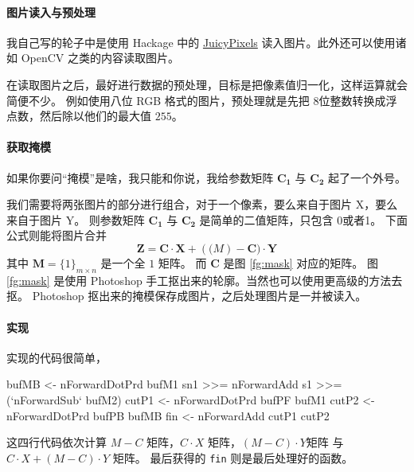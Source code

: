 \paragraph{图片读入与预处理}
我自己写的轮子中是使用 Hackage 中的 \href{http://hackage.haskell.org/package/JuicyPixels}{JuicyPixels}
读入图片。此外还可以使用诸如 OpenCV 之类的内容读取图片。

在读取图片之后，最好进行数据的预处理，目标是把像素值归一化，这样运算就会简便不少。
例如使用八位 RGB 格式的图片，预处理就是先把 8位整数转换成浮点数，然后除以他们的最大值 $255$。

\paragraph{获取掩模}
如果你要问“掩模”是啥，我只能和你说，我给参数矩阵 $\mathbf{C_1}$ 与 $\mathbf{C_2}$ 起了一个外号。

我们需要将两张图片的部分进行组合，对于一个像素，要么来自于图片 X，要么来自于图片 Y。
则参数矩阵 $\mathbf{C_1}$ 与 $\mathbf{C_2}$ 是简单的二值矩阵，只包含 0或者1。
下面公式则能将图片合并
\[
    \mathbf{Z} = \mathbf{C} \cdot \mathbf{X} + (\mathbf(M) - \mathbf{C}) \cdot \mathbf{Y}
\]
其中 $\mathbf{M} = \{1\}_{m \times n}$ 是一个全 $1$ 矩阵。
而 $\mathbf{C}$ 是图 \ref{fg:mask} 对应的矩阵。
图 \ref{fg:mask} 是使用 Photoshop 手工抠出来的轮廓。当然也可以使用更高级的方法去抠。
Photoshop 抠出来的掩模保存成图片，之后处理图片是一并被读入。

\paragraph{实现}
实现的代码很简单，
\begin{lstlistings}[language=Haskell]
bufMB <- nForwardDotPrd bufM1 sn1 >>= nForwardAdd s1 >>= (`nForwardSub` bufM2)
cutP1 <- nForwardDotPrd bufPF bufM1
cutP2 <- nForwardDotPrd bufPB bufMB
fin <- nForwardAdd cutP1 cutP2
\end{lstlistings}
这四行代码依次计算 $M-C$ 矩阵，$C \cdot X$ 矩阵，$(M - C) \cdot Y$矩阵 与 $C \cdot X + (M - C) \cdot Y$ 矩阵。
最后获得的 \verb|fin| 则是最后处理好的函数。
